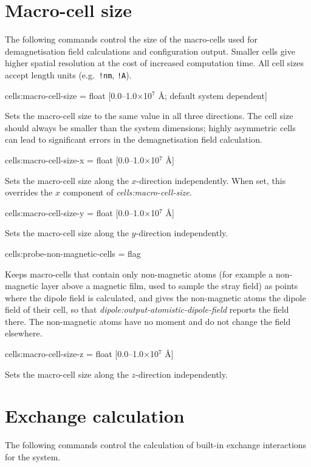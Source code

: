 \section*{Macro-cell size}
The following commands control the size of the macro-cells used for demagnetisation field calculations and configuration output. Smaller cells give higher spatial resolution at the cost of increased computation time. All cell sizes accept length units (e.g.\ \texttt{!nm}, \texttt{!A}).

{\zicf cells:macro-cell-size = float [0.0--1.0$\times$10$^7$ \AA; default system dependent]} Sets the macro-cell size to the same value in all three directions. The cell size should always be smaller than the system dimensions; highly asymmetric cells can lead to significant errors in the demagnetisation field calculation.

{\zicf cells:macro-cell-size-x = float [0.0--1.0$\times$10$^7$ \AA]} Sets the macro-cell size along the $x$-direction independently. When set, this overrides the $x$ component of \textit{cells:macro-cell-size}.

{\zicf cells:macro-cell-size-y = float [0.0--1.0$\times$10$^7$ \AA]} Sets the macro-cell size along the $y$-direction independently.

{\zicf cells:probe-non-magnetic-cells = flag} Keeps macro-cells that contain only non-magnetic atoms (for example a non-magnetic layer above a magnetic film, used to sample the stray field) as points where the dipole field is calculated, and gives the non-magnetic atoms the dipole field of their cell, so that \textit{dipole:output-atomistic-dipole-field} reports the field there. The non-magnetic atoms have no moment and do not change the field elsewhere.

{\zicf cells:macro-cell-size-z = float [0.0--1.0$\times$10$^7$ \AA]} Sets the macro-cell size along the $z$-direction independently.

\section*{Exchange calculation}
The following commands control the calculation of built-in exchange interactions
for the system.

